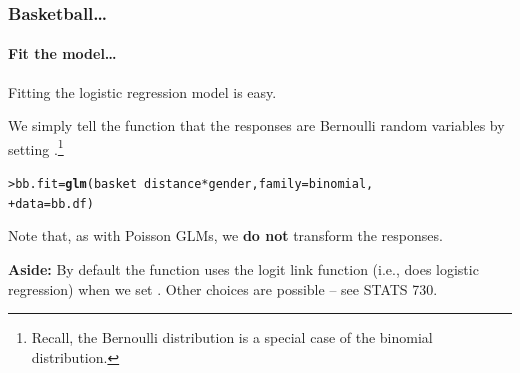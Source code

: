\documentclass{beamer}\usepackage[]{graphicx}\usepackage[]{xcolor}
\makeatletter
\newcommand{\hlopt}[1]{\textcolor[rgb]{0,0,0}{#1}}%
\newcommand{\hlstd}[1]{\textcolor[rgb]{0.345,0.345,0.345}{#1}}%
\newcommand{\hlkwb}[1]{\textcolor[rgb]{0.69,0.353,0.396}{#1}}%
\newcommand{\hlkwc}[1]{\textcolor[rgb]{0.333,0.667,0.333}{#1}}%
\newcommand{\hlkwd}[1]{\textcolor[rgb]{0.737,0.353,0.396}{\textbf{#1}}}%
\newenvironment{kframe}{%
 \def\at@end@of@kframe{}%
 \ifinner\ifhmode%
  \def\at@end@of@kframe{\end{minipage}}%
  \begin{minipage}{\columnwidth}%
 \fi\fi%
 \def\FrameCommand##1{\hskip\@totalleftmargin \hskip-\fboxsep
 \colorbox{shadecolor}{##1}\hskip-\fboxsep
     \hskip-\linewidth \hskip-\@totalleftmargin \hskip\columnwidth}%
 \MakeFramed {\advance\hsize-\width
   \@totalleftmargin\z@ \linewidth\hsize
   \@setminipage}}%
 {\par\unskip\endMakeFramed%
 \at@end@of@kframe}
\newenvironment{knitrout}{}{} %
\makeatother
\begin{document}
\begin{frame}[fragile]
\frametitle{Basketball\ldots}
\framesubtitle{Fit the model\ldots}
Fitting the logistic regression model is easy.
\medskip

We simply tell the  function that the responses are Bernoulli random variables by setting .\footnote{Recall, the Bernoulli distribution is a special case of the binomial distribution.}

\medskip

\begin{knitrout}\scriptsize
{}\color{fgcolor}\begin{kframe}
\begin{alltt}
\hlstd{> }\hlstd{bb.fit} \hlkwb{=} \hlkwd{glm}\hlstd{(basket} \hlopt{~} \hlstd{distance} \hlopt{*} \hlstd{gender,} \hlkwc{family} \hlstd{= binomial,}
\hlstd{+ }             \hlkwc{data} \hlstd{= bb.df)}
\end{alltt}
\end{kframe}
\end{knitrout}

\medskip

Note that, as with Poisson GLMs, we \textbf{do not} transform the responses. 
\bigskip

{\bf Aside:} By default the  function uses the logit link function (i.e., does logistic regression) when we set . Other choices are possible -- see STATS 730.
\end{frame}
\end{document}
